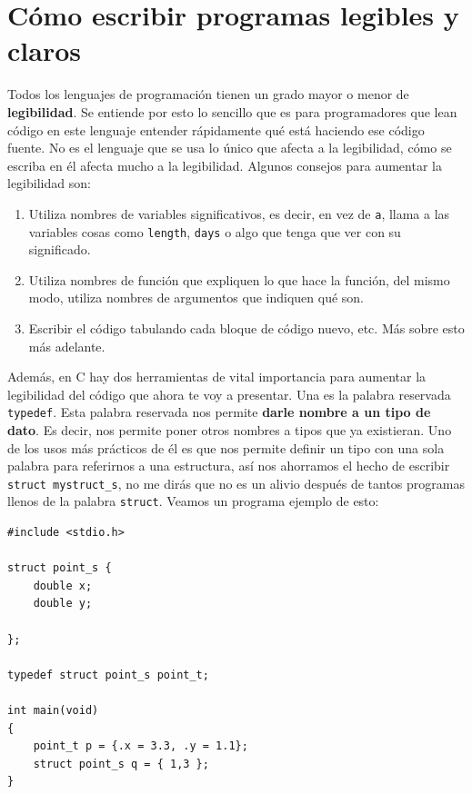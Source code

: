 \documentclass[a4paper]{article}
\begin{document}
\section{Cómo escribir programas legibles y claros}
Todos los lenguajes de programación tienen un grado mayor o menor de
\textbf{legibilidad}. Se entiende por esto lo sencillo que es para programadores
que lean código en este lenguaje entender rápidamente qué está haciendo ese
código fuente. No es el lenguaje que se usa lo único que afecta a la
legibilidad, cómo se escriba en él afecta mucho a la legibilidad. Algunos
consejos para aumentar la legibilidad son:
\begin{enumerate}
\item Utiliza nombres de variables significativos, es decir, en vez de \verb!a!,
llama a las variables cosas como \verb!length!, \verb!days! o algo que tenga
que ver con su significado.
\item Utiliza nombres de función que expliquen lo que hace la función, del mismo
modo, utiliza nombres de argumentos que indiquen qué son.
\item Escribir el código tabulando cada bloque de código nuevo, etc. Más sobre
esto más adelante.
\end{enumerate}

Además, en C hay dos herramientas de vital importancia para aumentar la
legibilidad del código que ahora te voy a presentar. Una es la palabra
reservada \lstinline[style=C]!typedef!. Esta palabra reservada nos permite
\textbf{darle nombre a un tipo de dato}. Es decir, nos permite poner otros
nombres a tipos que ya existieran. Uno de los usos más prácticos de él es que
nos permite definir un tipo con una sola palabra para referirnos a una
estructura, así nos ahorramos el hecho de escribir \verb!struct mystruct_s!,
no me dirás que no es un alivio después de tantos programas llenos de la palabra
\verb!struct!. Veamos un programa ejemplo de esto:


\noindent
\begin{minipage}[H]{\linewidth}
\mbox{}
\begin{lstlisting}[style=C,
caption={Definición de un tipo a partir de una estructura},
label={lst:structTypeDefinition}]
#include <stdio.h>

struct point_s {
    double x;
    double y;

};

typedef struct point_s point_t;

int main(void)
{
    point_t p = {.x = 3.3, .y = 1.1};
    struct point_s q = { 1,3 };
}
\end{lstlisting}
\end{minipage}
\end{document}
